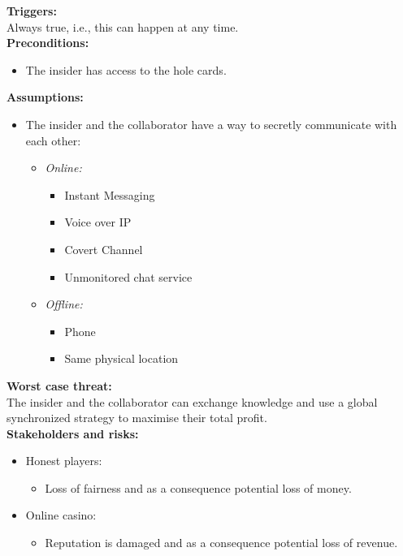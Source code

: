\documentclass[a4paper,11pt]{report}
\begin{document}
\textbf{Triggers:}\\
Always true, i.e., this can happen at any time. \\
\textbf{Preconditions:}
\begin{itemize}
\item The insider has access to the hole cards.
\end{itemize}
\textbf{Assumptions:}
\begin{itemize}
\item The insider and the collaborator have a way to secretly communicate with each other:
\begin{itemize}
\item \emph{Online:}
\begin{itemize}
\item Instant Messaging
\item Voice over IP
\item Covert Channel
\item Unmonitored chat service
\end{itemize}
\item \emph{Offline:}
\begin{itemize}
\item Phone
\item Same physical location
\end{itemize}
\end{itemize}
\end{itemize}
\textbf{Worst case threat:}\\
The insider and the collaborator can exchange knowledge and use a global synchronized strategy to maximise their total profit. \\
\textbf{Stakeholders and risks:}
\begin{itemize}
\item Honest players:
\begin{itemize}
\item Loss of fairness and as a consequence potential loss of money.
\end{itemize}
\item Online casino:
\begin{itemize}
\item Reputation is damaged and as a consequence potential loss of revenue.
\end{itemize}
\end{itemize}
\end{document}
